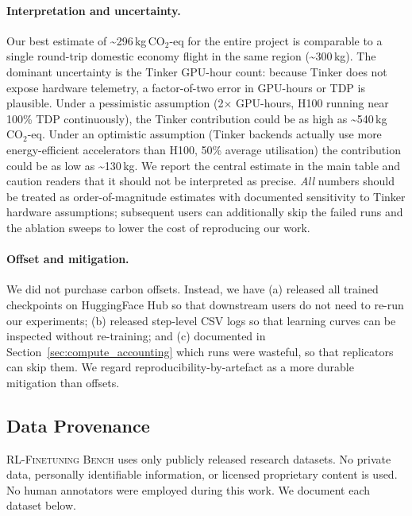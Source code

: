 \documentclass{article}
\newcommand{\ours}{\textsc{RL-Finetuning Bench}}
\begin{document}
\paragraph{Interpretation and uncertainty.}
Our best estimate of \textasciitilde 296\,kg\,CO$_2$-eq for the entire
project is comparable to a single round-trip domestic economy flight in
the same region (\textasciitilde 300\,kg). The dominant uncertainty is
the Tinker GPU-hour count: because Tinker does not expose hardware telemetry,
a factor-of-two error in GPU-hours or TDP is plausible. Under a pessimistic
assumption (2$\times$ GPU-hours, H100 running near 100\% TDP continuously),
the Tinker contribution could be as high as \textasciitilde 540\,kg CO$_2$-eq.
Under an optimistic assumption (Tinker backends actually use more
energy-efficient accelerators than H100, 50\% average utilisation) the
contribution could be as low as \textasciitilde 130\,kg. We report the
central estimate in the main table and caution readers that it should not
be interpreted as precise. \emph{All} numbers should be treated as
order-of-magnitude estimates with documented sensitivity to Tinker
hardware assumptions; subsequent users can additionally skip the failed
runs and the ablation sweeps to lower the cost of reproducing our work.

\paragraph{Offset and mitigation.}
We did not purchase carbon offsets. Instead, we have (a) released all
trained checkpoints on HuggingFace Hub so that downstream users do not
need to re-run our experiments; (b) released step-level CSV logs so that
learning curves can be inspected without re-training; and (c) documented
in Section~\ref{sec:compute_accounting} which runs were wasteful, so that
replicators can skip them. We regard reproducibility-by-artefact as a
more durable mitigation than offsets.

\subsection{Data Provenance}
\label{sec:provenance}


\ours{} uses only publicly released research datasets. No private data,
personally identifiable information, or licensed proprietary content is
used. No human annotators were employed during this work. We document
each dataset below.
\end{document}
